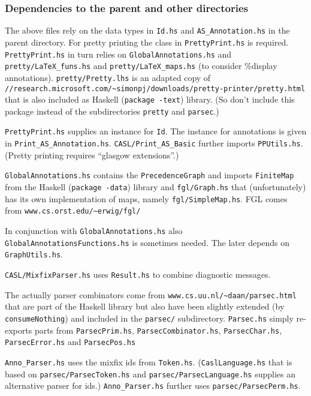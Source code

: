 \documentclass{article}
\begin{document}
\subsubsection*{Dependencies to the parent and other directories}
\label{sec:casl}

The above files rely on the data types in \texttt{Id.hs} and
\texttt{AS\_Annotation.hs} in the parent directory. For pretty
printing the class in \texttt{PrettyPrint.hs} is required.
\texttt{PrettyPrint.hs} in turn relies on
\texttt{GlobalAnnotations.hs} and \texttt{pretty/LaTeX\_funs.hs} and
\texttt{pretty/LaTeX\_maps.hs} (to consider \%display annotations).
\texttt{pretty/Pretty.lhs} is an adapted copy of\\
\texttt{//research.microsoft.com/\~{}simonpj/downloads/pretty-printer/pretty.html}
that is also included as Haskell (\texttt{package -text}) library. (So
don't include this package instead of the subdirectories
\texttt{pretty} and \texttt{parsec}.)

\texttt{PrettyPrint.hs} supplies an instance for \texttt{Id}. The
instance for annotations is given in \texttt{Print\_AS\_Annotation.hs}.
\texttt{CASL/Print\_AS\_Basic} further imports
\texttt{PPUtils.hs}. (Pretty printing requires ``glasgow extensions''.)

\texttt{GlobalAnnotations.hs} contains the \texttt{PrecedenceGraph} and
imports \texttt{FiniteMap} from the Haskell (\texttt{package -data})
library and \texttt{fgl/Graph.hs} that (unfortunately) has its
own implementation of maps, namely
\texttt{fgl/SimpleMap.hs}. 
FGL comes from \texttt{www.cs.orst.edu/\~{}erwig/fgl/}

In conjunction with \texttt{GlobalAnnotations.hs} also
\texttt{GlobalAnnotationsFunctions.hs} is sometimes needed. The later
depends on \texttt{GraphUtils.hs}. 

\texttt{CASL/MixfixParser.hs} uses \texttt{Result.hs} to combine
diagnostic messages.

The actually parser combinators come from 
\texttt{www.cs.uu.nl/\~{}daan/parsec.html} that are part of the
Haskell library but also have been slightly extended (by
\texttt{consumeNothing}) and included in the \texttt{parsec/}
subdirectory. \texttt{Parsec.hs} simply re-exports parts from
\texttt{ParsecPrim.hs}, \texttt{ParsecCombinator.hs},
\texttt{ParsecChar.hs}, \texttt{ParsecError.hs} and
\texttt{ParsecPos.hs}

\texttt{Anno\_Parser.hs} uses the mixfix ids from \texttt{Token.hs}.
(\texttt{CaslLanguage.hs} that is based on \texttt{parsec/ParsecToken.hs} and
\texttt{parsec/ParsecLanguage.hs} supplies an alternative parser for ids.)
\texttt{Anno\_Parser.hs} further uses \texttt{parsec/ParsecPerm.hs}.
\end{document}
